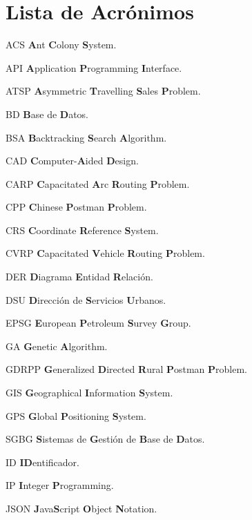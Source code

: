 \chapter*{Lista de Acrónimos\hfill}
\begin{abbreviations}
    \item[ACS] \textbf{A}nt \textbf{C}olony \textbf{S}ystem.
    \item[API] \textbf{A}pplication \textbf{P}rogramming \textbf{I}nterface.
    \item[ATSP] \textbf{A}symmetric \textbf{T}ravelling \textbf{S}ales \textbf{P}roblem.
    \item[BD] \textbf{B}ase de \textbf{D}atos.
    \item[BSA] \textbf{B}acktracking \textbf{S}earch \textbf{A}lgorithm.
    \item[CAD] \textbf{C}omputer-\textbf{A}ided \textbf{D}esign.
    \item[CARP] \textbf{C}apacitated \textbf{A}rc \textbf{R}outing \textbf{P}roblem.
    \item[CPP] \textbf{C}hinese \textbf{P}ostman \textbf{P}roblem.
    \item[CRS] \textbf{C}oordinate \textbf{R}eference \textbf{S}ystem.
    \item[CVRP] \textbf{C}apacitated \textbf{V}ehicle \textbf{R}outing \textbf{P}roblem.
    \item[DER] \textbf{D}iagrama \textbf{E}ntidad \textbf{R}elación.
    \item[DSU] \textbf{D}irección de \textbf{S}ervicios \textbf{U}rbanos.
    \item[EPSG] \textbf{E}uropean \textbf{P}etroleum \textbf{S}urvey \textbf{G}roup.
    \item[GA] \textbf{G}enetic \textbf{A}lgorithm.
    \item[GDRPP] \textbf{G}eneralized \textbf{D}irected \textbf{R}ural \textbf{P}ostman \textbf{P}roblem.
    \item[GIS] \textbf{G}eographical \textbf{I}nformation \textbf{S}ystem.
    \item[GPS] \textbf{G}lobal \textbf{P}ositioning \textbf{S}ystem.
    \item[SGBG] \textbf{S}istemas de \textbf{G}estión de \textbf{B}ase de \textbf{D}atos.
    \item[ID] \textbf{ID}entificador.
    \item[IP] \textbf{I}nteger \textbf{P}rogramming.
    \item[JSON] \textbf{J}ava\textbf{S}cript \textbf{O}bject \textbf{N}otation.

\end{abbreviations}
